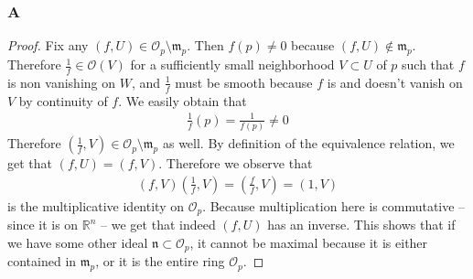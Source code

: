 \documentclass{article}
\newcommand{\R}{\mathbb{R}}
\newcommand{\fO}{\mathscr{O}}
\begin{document}
\subsubsection{A}\label{2.1.A}
\begin{proof}
    Fix any $(f,U)\in \fO_p\setminus \mathfrak{m}_p$. Then $f(p)\ne 0$ because $(f,U)\notin \mathfrak{m}_p$. Therefore $\frac{1}{f}\in \fO(V)$ for a sufficiently small neighborhood $V\subset U$ of $p$ such that $f$ is non vanishing on $W$, and $\frac{1}{f}$ must be smooth because $f$ is and doesn't vanish on $V$ by continuity of $f$. We easily obtain that
    \begin{align*}
        \frac{1}{f}(p)=\frac{1}{f(p)} \ne 0
    \end{align*}
    Therefore $(\frac{1}{f},V)\in \fO_p\setminus \mathfrak{m}_p$ as well. By definition of the equivalence relation, we get that $(f,U)=(f,V)$. Therefore we observe that
    \begin{align*}
        (f,V)(\frac{1}{f},V)=(\frac{f}{f},V)=(1,V)
    \end{align*}
    is the multiplicative identity on $\fO_p$. Because multiplication here is commutative --since it is on $\R^n$ -- we get that indeed $(f,U)$ has an inverse. This shows that if we have some other ideal $\mathfrak{n}\subset \fO_p$, it cannot be maximal because it is either contained in $\mathfrak{m}_p$, or it is the entire ring $\fO_p$.
\end{proof}
\end{document}

